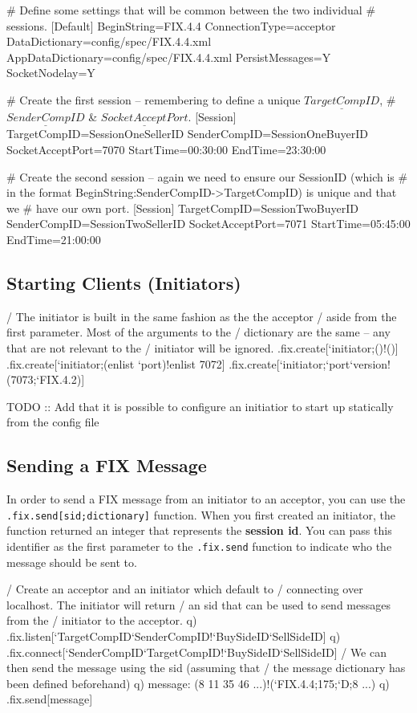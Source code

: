 \begin{inicode}
# Define some settings that will be common between the two individual 
# sessions.
[Default]
BeginString=FIX.4.4
ConnectionType=acceptor
DataDictionary=config/spec/FIX.4.4.xml
AppDataDictionary=config/spec/FIX.4.4.xml
PersistMessages=Y
SocketNodelay=Y

# Create the first session -- remembering to define a unique $\underline{TargetCompID}$,
# $\underline{SenderCompID}$ & $\underline{SocketAcceptPort}$.
[Session]
TargetCompID=SessionOneSellerID
SenderCompID=SessionOneBuyerID
SocketAcceptPort=7070
StartTime=00:30:00
EndTime=23:30:00

# Create the second session -- again we need to ensure our SessionID (which is
# in the format BeginString:SenderCompID->TargetCompID) is unique and that we
# have our own port.
[Session]
TargetCompID=SessionTwoBuyerID
SenderCompID=SessionTwoSellerID
SocketAcceptPort=7071
StartTime=05:45:00
EndTime=21:00:00
\end{inicode}

\subsection{Starting Clients (Initiators)}

\begin{qcode}
/ The initiator is built in the same fashion as the the acceptor
/ aside from the first parameter. Most of the arguments to the
/ dictionary are the same -- any that are not relevant to the 
/ initiator will be ignored.
.fix.create[`initiator;()!()]
.fix.create[`initiator;(enlist `port)!enlist 7072]
.fix.create[`initiator;`port`version!(7073;`FIX.4.2)]
\end{qcode}

TODO :: Add that it is possible to configure an initiatior to start up statically from the config file

\subsection{Sending a FIX Message}
In order to send a FIX message from an initiator to an acceptor, you can use the \texttt{.fix.send[sid;dictionary]} function. When you first created an initiator, 
the function returned an integer that represents the \textbf{session id}. You can
pass this identifier as the first parameter to the \texttt{.fix.send} function
to indicate who the message should be sent to.

\begin{qcode}
/ Create an acceptor and an initiator which default to 
/ connecting over localhost. The initiator will return
/ an sid that can be used to send messages from the
/ initiator to the acceptor.
q) .fix.listen[`TargetCompID`SenderCompID!`BuySideID`SellSideID]
q) .fix.connect[`SenderCompID`TargetCompID!`BuySideID`SellSideID]
/ We can then send the message using the sid (assuming that
/ the message dictionary has been defined beforehand)
q) message: (8 11 35 46 ...)!(`FIX.4.4;175;`D;8 ...)
q) .fix.send[message]
\end{qcode}

